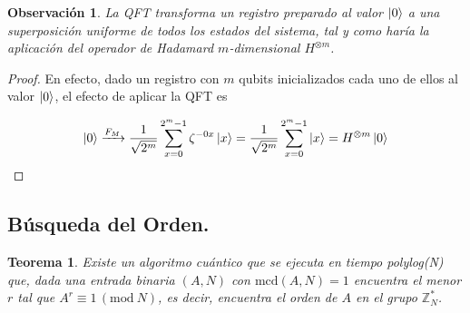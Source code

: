 \documentclass[11pt, spanish]{report}
\numberwithin{equation}{section}
\newtheorem{teo}[defin]{Teorema}
\newtheorem{obs}[defin]{Observación}
\numberwithin{defin}{section}
\newenvironment{yellowBox}{\begin{tcolorbox}[colback=yellow!5!white,colframe=yellow!75!black]}{\end{tcolorbox}}
\begin{document}
%
%
%
%
%
%

\begin{obs} \label{ejemploFourier} La QFT transforma un registro preparado al valor $\ket{0}$ a una superposición uniforme de todos los estados del sistema, tal y como haría la aplicación del operador de Hadamard $m$-dimensional $H^{\otimes m}$.
\end{obs}

\begin{proof}
En efecto, dado un registro con $m$ qubits inicializados cada uno de ellos al valor $\ket{0}$, el efecto de aplicar la QFT es

\begin{equation}
\ket{0} \xrightarrow{F_M}\frac{1}{\sqrt{2^m}}\sum_{x=0}^{2^m-1}\zeta^{-0x}\ket{x}=\frac{1}{\sqrt{2^m}}\sum_{x=0}^{2^m-1}\ket{x}=H^{\otimes m}\ket{0}
\end{equation}
\end{proof}


\subsection{Búsqueda del Orden.}

\begin{yellowBox}
\begin{teo} \label{algoritmoModular}
Existe un algoritmo cuántico que se ejecuta en tiempo polylog(N) que, dada una entrada binaria $(A,N)$ con $\text{mcd}(A,N)=1$ encuentra el menor $r$ tal que $A^r\equiv 1\,  (\text{mod}\ N)$, es decir, encuentra el orden de $A$ en el grupo $\mathbb{Z}_N^*$.
\end{teo}
\end{yellowBox}
\end{document}
